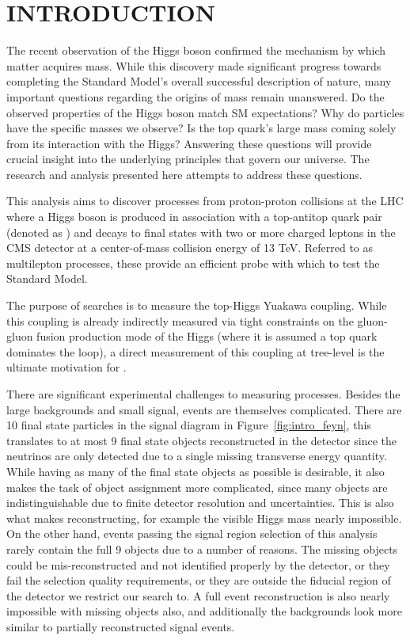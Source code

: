 %
%

\chapter{INTRODUCTION}
The recent observation of the Higgs boson confirmed the mechanism by which matter acquires mass. While this discovery made
significant progress towards completing the Standard Model's overall successful description of nature, many important questions
regarding the origins of mass remain unanswered. Do the observed properties of the Higgs boson match SM expectations? Why do
particles have the specific masses we observe? Is the top quark's large mass coming solely from its interaction with the Higgs?
Answering these questions will provide crucial insight into the underlying principles that govern our universe. The research and
analysis presented here attempts to address these questions. 

This analysis aims to discover processes from proton-proton collisions at the LHC where a Higgs boson is produced in association
with a top-antitop quark pair (denoted as \tth) and decays to final states with two or more charged leptons in the CMS detector
at a center-of-mass collision energy of 13 TeV.
Referred to as \tth multilepton processes, these provide an efficient probe with which to test the Standard Model. 

The purpose of \tth searches is to measure the top-Higgs Yuakawa coupling. While this coupling is already indirectly measured via tight constraints
on the gluon-gluon fusion production mode of the Higgs (where it is assumed a top quark dominates the loop), a direct measurement of this coupling
at tree-level is the ultimate motivation for \tth. 

There are significant experimental challenges to measuring \tth processes. Besides the large backgrounds and small signal, \tth events are themselves
complicated. There are 10 final state particles in the signal diagram in Figure~\ref{fig:intro_feyn}, this translates to at most 9 final state objects
reconstructed in the detector since the neutrinos are only detected due to a single missing transverse energy quantity. While having as many of the final
state objects as possible is desirable, it also makes the task of object assignment more complicated, since many objects are indistinguishable due to
finite detector resolution and uncertainties. This is also what makes reconstructing, for example the visible Higgs mass nearly impossible. On the other hand,
events passing the signal region selection of this analysis rarely contain the full 9 objects due to a number of reasons. The missing objects could be mis-reconstructed
and not identified properly by the detector, or they fail the selection quality requirements, or they are outside the fiducial region of the detector
we restrict our search to. A full event reconstruction is also nearly impossible with missing objects also, and additionally the backgrounds look more similar
to partially reconstructed \tth signal events. 


